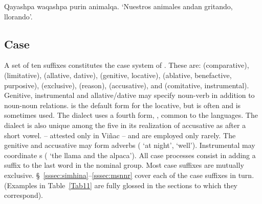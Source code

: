 {%
{Qayashpa waqashpa purin animalqa.}%
{}%
%
{`Nuestros animales andan gritando, llorando'.}%
{}{}%

\subsection{Case}\label{ssec:case}
A set of ten suffixes constitutes the case system of \SYQ{}. These are:  (comparative),  (limitative),  (allative, dative),  (genitive, locative),  (ablative, benefactive, purposive),  (exclusive),  (reason),  (accusative), and  (comitative, instrumental). Genitive, instrumental and allative/dative may specify noun-verb in addition to noun-noun relations.  is the default form for the locative, but  is often and  is sometimes used. The \CH{} dialect uses a fourth form, , common to the \QI{} languages. The \CH{} dialect is also unique among the five in its realization of accusative  as  after a short vowel.  -- attested only in Vi\~nac -- and  are employed only rarely. The genitive and accusative may form adverbs ( `at night',  `well'). Instrumental  may coordinate s (  `the llama and the alpaca'). All case processes consist in adding a suffix to the last word in the nominal group. Most case suffixes are mutually exclusive. \S~\ref{sssec:simhina}--\ref{sssec:msnnr} cover each of the case suffixes in turn. (Examples in Table~\ref{Tab11} are fully glossed in the sections to which they correspond).

}
